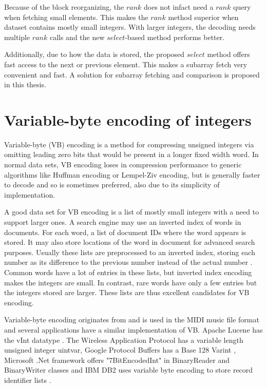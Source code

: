 Because of the block reorganizing, the $rank$ does not infact need a $rank$ query when fetching small elements. This makes the $rank$ method superior when dataset contains 
mostly small integers. With larger integers, the decoding needs multiple $rank$ calls and the new $select$-based method performs better. 

Additionally, due to how the data is stored, the proposed $select$ method offers fast access to the next or previous element. This makes a subarray fetch 
very convenient and fast. A solution for subarray fetching and comparison is proposed in this thesis.




\chapter{Variable-byte encoding of integers}

Variable-byte (VB) encoding \citep{Wil99} is a method for compressing unsigned integers via omitting leading zero bits that would be present in a longer fixed 
width word. In normal data sets, VB encoding loses in compression performance to generic algorithms like Huffman encoding or Lempel-Ziv encoding, but 
is generally faster to decode \citep{Bri09} and so is sometimes preferred, also  due to its simplicity of implementation.

A good data set for VB encoding is a list of mostly small integers with a need to support larger ones. A search engine may use an inverted index of 
words in documents. For each word, a list of document IDs where the word appears is stored. It may also store locations of the word in document for 
advanced search purposes. Usually these lists are preprocessed to an inverted index, storing each number as its difference to the previous number 
instead of the actual number \citep{Man08}. Common words have a lot of entries in these lists, but inverted index encoding makes the integers are small. 
In contrast, rare words have only a few entries but the integers stored are larger. These lists are thus excellent candidates for VB encoding. 

Variable-byte encoding originates from and is used in the MIDI music file format \citep{Mid96} and several applications have a similar implementation of VB. Apache 
Lucene has the vInt datatype \citep{ApaLV}. The Wireless Application Protocol has a variable length unsigned integer uintvar, Google Protocol Buffers has a Base 128 Varint \citep{GooPB},
 Microsoft .Net framework offers "7BitEncodedInt" in BinaryReader and BinaryWriter classes and IBM DB2 uses variable byte encoding to store record identifier lists \citep{Bha09}.

